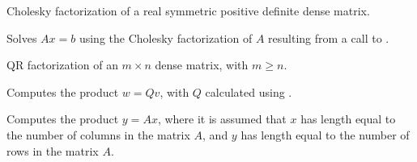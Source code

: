 \documentclass[letterpaper,10pt,english]{sphinxmanual}
\begin{document}

\begin{fulllineitems}
\label{linear_solvers/DLS:DensePOTRF}
Cholesky factorization of a real symmetric positive definite dense matrix.

\end{fulllineitems}


\begin{fulllineitems}
\label{linear_solvers/DLS:DensePOTRS}
Solves $Ax = b$ using the Cholesky factorization of $A$
resulting from a call to {\hyperref[linear_solvers/DLS:DensePOTRF]{}}.

\end{fulllineitems}


\begin{fulllineitems}
\label{linear_solvers/DLS:DenseGEQRF}
QR factorization of an $m \times n$ dense matrix, with $m \ge n$.

\end{fulllineitems}


\begin{fulllineitems}
\label{linear_solvers/DLS:DenseORMQR}
Computes the product $w = Qv$, with $Q$ calculated
using {\hyperref[linear_solvers/DLS:DenseGEQRF]{}}.

\end{fulllineitems}


\begin{fulllineitems}
\label{linear_solvers/DLS:DenseMatvec}
Computes the product $y = Ax$, where it is assumed that
$x$ has length equal to the number of columns in the matrix
$A$, and $y$ has length equal to the number of rows in
the matrix $A$.

\end{fulllineitems}
\end{document}
